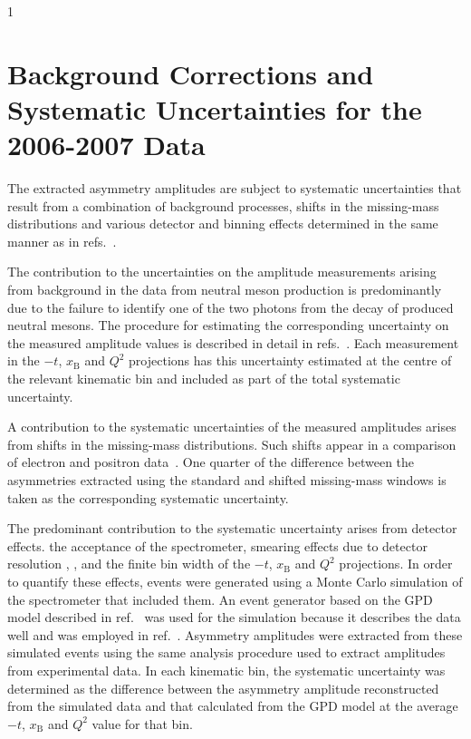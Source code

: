 1\section{Background Corrections and Systematic Uncertainties for the
  2006-2007 Data}
The extracted asymmetry amplitudes are subject to systematic uncertainties that
result from a combination of background processes, 
shifts in the missing-mass distributions and various detector and binning
effects determined in the same manner as in refs.~\cite{Air08,Air09}.

The contribution to the uncertainties on the amplitude measurements
arising from background in the data from neutral meson
production is predominantly due to the failure to identify one of
  the two photons from the decay of produced neutral mesons. The procedure for estimating the corresponding
uncertainty on the measured amplitude values is described in detail in
refs.~\cite{Air08,Air09}. Each measurement in the $-t$, $x_{\textrm{B}}$ and
  $Q^{2}$ projections has this uncertainty estimated at the
  centre of the relevant kinematic bin and included as part of the
  total systematic uncertainty.

A contribution to the systematic uncertainties of the
  measured amplitudes arises from shifts in  the
missing-mass distributions. Such shifts appear in a comparison of electron and positron data~\cite{Zei09,Bur10}. One
quarter of the difference between the asymmetries extracted using the standard
and shifted missing-mass windows is taken as the corresponding systematic
uncertainty. 

The predominant contribution to the systematic uncertainty arises from detector
effects.  the acceptance of the spectrometer, smearing
effects due to detector resolution , , and the finite bin width of the $-t$, $x_{\textrm{B}}$ and $Q^{2}$ projections. In order to quantify these effects, events were generated using a Monte Carlo simulation of the spectrometer that included them. An event generator based on the GPD model described in ref.~\cite{Van99,Goe01} was
used for the simulation because it describes the data well and was employed in ref.~\cite{Air09}. Asymmetry amplitudes were extracted
from these simulated events using the same analysis procedure used to
extract amplitudes from experimental data. In each kinematic bin, the
systematic uncertainty was determined as the difference between the asymmetry amplitude reconstructed from the simulated data and that
calculated from the GPD model at the average $-t$, $x_{\textrm{B}}$ and
$Q^{2}$ value for that bin.

